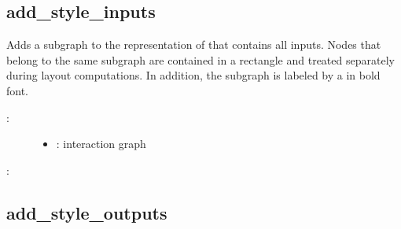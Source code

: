 \documentclass[letterpaper,10pt,english]{sphinxmanual}
\begin{document}
\subsection{add\_style\_inputs}
\label{\detokenize{InteractionGraphs:add-style-inputs}}\label{\detokenize{InteractionGraphs:id11}}

\begin{fulllineitems}
\label{\detokenize{InteractionGraphs:PyBoolNet.InteractionGraphs.add_style_inputs}}
Adds a subgraph to the  representation of  that contains all inputs.
Nodes that belong to the same  subgraph are contained in a rectangle and treated separately during layout computations.
In addition, the subgraph is labeled by a  in bold font.
\begin{description}
\item[{:}] \leavevmode\begin{itemize}
\item {} 
: interaction graph

\end{itemize}

\end{description}

:

\begin{sphinxVerbatim}[commandchars=\\\{\}]
\end{sphinxVerbatim}

\end{fulllineitems}



\subsection{add\_style\_outputs}
\label{\detokenize{InteractionGraphs:id12}}\label{\detokenize{InteractionGraphs:add-style-outputs}}
\end{document}
